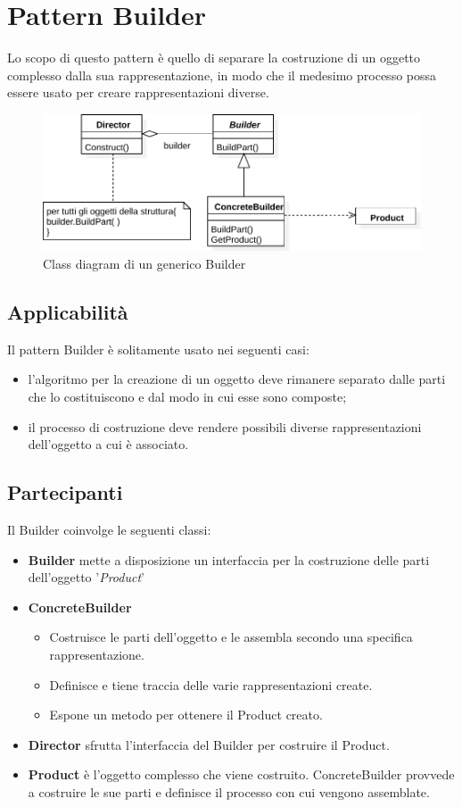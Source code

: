 \section{Pattern Builder}
\label{sec:builder}
Lo scopo di questo pattern è quello di separare la costruzione di un oggetto complesso dalla sua rappresentazione, in modo che il medesimo processo possa essere usato per creare rappresentazioni diverse.
\begin{figure}[htbp]
\centering
\includegraphics[width=\textwidth,height=\textheight,keepaspectratio]{images/builder-design-pattern.pdf}
\caption{Class diagram di un generico Builder}
\label{fig:builder-design-pattern}
\end{figure}
\subsection{Applicabilità}
Il pattern Builder è solitamente usato nei seguenti casi:
\begin{itemize}
\item l'algoritmo per la creazione di un oggetto deve rimanere separato dalle parti che lo costituiscono e dal modo in cui esse sono composte;
\item il processo di costruzione deve rendere possibili diverse rappresentazioni dell'oggetto a cui è associato.
\end{itemize}
\subsection{Partecipanti}
Il Builder coinvolge le seguenti classi:
\begin{itemize}
\item \textbf{Builder} mette a disposizione un interfaccia per la costruzione delle parti dell'oggetto '\textit{Product}'
\item \textbf{ConcreteBuilder} 
	\begin{itemize}
	\item Costruisce le parti dell'oggetto e le assembla secondo una specifica rappresentazione.
	\item Definisce e tiene traccia delle varie rappresentazioni create.
	\item Espone un metodo per ottenere il Product creato.
	\end{itemize}
\item \textbf{Director} sfrutta l'interfaccia del Builder per costruire il Product.
\item \textbf{Product} è l'oggetto complesso che viene costruito. ConcreteBuilder provvede a costruire le sue parti e definisce il processo con cui vengono assemblate. 
\end{itemize}

